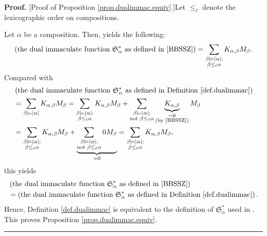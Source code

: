 \documentclass
[numbers=enddot,12pt,final,onecolumn,notitlepage,abstracton]{scrartcl}%
\theoremstyle{definition}
\newenvironment{proof}[1][Proof]{\noindent\textbf{#1.} }{\ \rule{0.5em}{0.5em}}
\newenvironment{verlong}{}{}
\let\sumnonlimits\sum
\renewcommand{\sum}{\sumnonlimits\limits}
\begin{document}
\begin{verlong}
\begin{proof}
[Proof of Proposition \ref{prop.dualimmac.equiv}.]Let $\leq_{\ell}$ denote the
lexicographic order on compositions.

Let $\alpha$ be a composition. Then, \cite[Proposition 3.36]{BBSSZ} yields the
following:%
\[
\left(  \text{the dual immaculate function }\mathfrak{S}_{\alpha}^{\ast}\text{
as defined in \cite{BBSSZ}}\right)  =\sum_{\substack{\beta\models\left\vert
\alpha\right\vert ;\\\beta\leq_{\ell}\alpha}}K_{\alpha,\beta}M_{\beta}.
\]
Compared with%
\begin{align*}
&  \left(  \text{the dual immaculate function }\mathfrak{S}_{\alpha}^{\ast
}\text{ as defined in Definition \ref{def.dualimmac}}\right) \\
&  =\sum_{\beta\models\left\vert \alpha\right\vert }K_{\alpha,\beta}M_{\beta
}=\sum_{\substack{\beta\models\left\vert \alpha\right\vert ;\\\beta\leq_{\ell
}\alpha}}K_{\alpha,\beta}M_{\beta}+\sum_{\substack{\beta\models\left\vert
\alpha\right\vert ;\\\text{not }\beta\leq_{\ell}\alpha}}\underbrace{K_{\alpha
,\beta}}_{\substack{=0\\\text{(by \cite[Proposition 3.15 (2)]{BBSSZ})}%
}}M_{\beta}\\
&  =\sum_{\substack{\beta\models\left\vert \alpha\right\vert ;\\\beta
\leq_{\ell}\alpha}}K_{\alpha,\beta}M_{\beta}+\underbrace{\sum_{\substack{\beta
\models\left\vert \alpha\right\vert ;\\\text{not }\beta\leq_{\ell}\alpha
}}0M_{\beta}}_{=0}=\sum_{\substack{\beta\models\left\vert \alpha\right\vert
;\\\beta\leq_{\ell}\alpha}}K_{\alpha,\beta}M_{\beta},
\end{align*}
this yields%
\begin{align*}
&  \left(  \text{the dual immaculate function }\mathfrak{S}_{\alpha}^{\ast
}\text{ as defined in \cite{BBSSZ}}\right) \\
&  =\left(  \text{the dual immaculate function }\mathfrak{S}_{\alpha}^{\ast
}\text{ as defined in Definition \ref{def.dualimmac}}\right)  .
\end{align*}
Hence, Definition \ref{def.dualimmac} is equivalent to the definition of
$\mathfrak{S}_{\alpha}^{\ast}$ used in \cite{BBSSZ}. This proves Proposition
\ref{prop.dualimmac.equiv}.
\end{proof}
\end{verlong}
\end{document}
